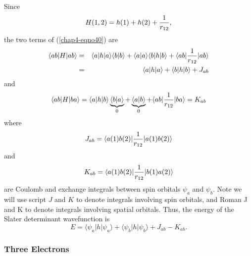 {Since
\begin{equation}
H (1,2) = h (1) + h (2) + {1 \over r_{12}},
\end{equation}
the two terms of (\ref{chap4-eqno40}) are
\begin{eqnarray}
\langle ab | H | ab \rangle &=& \langle a | h | a \rangle \langle b | 
b \rangle + \langle a | a \rangle \langle b | h | b \rangle + \langle ab | 
{1 \over r_{12}} | ab \rangle\cr
&=& \langle a | h | a \rangle + \langle b | h | b \rangle + J_{ab}
\end{eqnarray}
and
\begin{equation}
\langle ab | H | ba \rangle = \langle a | h | b \rangle 
\underbrace{\langle b | a \rangle}_{0} + \underbrace{\langle a | b 
\rangle}_{0} + \langle ab | {1 \over r_{12}} | ba \rangle = 
K_{ab}
\end{equation}
where
\begin{equation}
J_{ab} = \langle a (1) b (2) | {1 \over r_{12}} | a 
(1) b (2) \rangle 
\label{chap4-eqno41}
\end{equation}
and
\begin{equation}
K_{ab} = \langle a (1) b (2) | {1 \over r_{12}} | b(1) a 
(2) \rangle
\label{chap4-eqno42}
\end{equation}
are Coulomb and exchange integrals between spin orbitals $\psi_a$ and 
$\psi_b$.  Note we will use script $J$ and $K$ to denote integrals involving 
spin orbitals, and Roman J and K to denote integrals involving spatial 
orbitals.  Thus, the energy of the Slater determinant wavefunction is
\begin{equation}
E = \langle \psi_a | h | \psi_a \rangle + \langle \psi_b | h | \psi_b 
\rangle + J_{ab} - K_{ab}.
\end{equation}

\subsubsection{Three Electrons}

}
